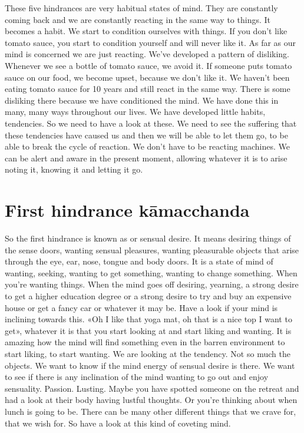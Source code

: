 \documentclass[letterpaper,10pt,english]{sphinxmanual}
\begin{document}
\sphinxAtStartPar
These five hindrances are very habitual states of mind. They are constantly  coming  back  and  we  are  constantly  reacting  in  the  same  way  to
things. It becomes a habit. We start to condition ourselves with things. If you
don’t like tomato sauce, you start to condition yourself and will never like
it. As far as our mind is concerned we are just reacting. We’ve developed a
pattern of disliking. Whenever we see a bottle of tomato sauce, we avoid it.
If someone puts tomato sauce on our food, we become upset, because we
don’t like it. We haven’t been eating tomato sauce for 10 years and still react
in the same way. There is some disliking there because we have conditioned
the mind. We have done this in many, many ways throughout our lives. We
have developed little habits, tendencies. So we need to have a look at these.
We need to see the suffering that these tendencies have caused us and then
we will be able to let them go, to be able to break the cycle of reaction. We
don’t have to be reacting machines. We can be alert and aware in the present
moment, allowing whatever it is to arise noting it, knowing it and letting it
go.


\section{First hindrance kāmacchanda}
\label{\detokenize{3-a:first-hindrance-kamacchanda}}
\sphinxAtStartPar
So the first hindrance is known as
or sensual desire. It
means desiring things of the sense doors, wanting sensual pleasures, wanting pleasurable objects that arise through the eye, ear, nose, tongue and body
doors. It is a state of mind of wanting, seeking, wanting to get something,
wanting to change something. When you’re wanting things. When the mind
goes off desiring, yearning, a strong desire to get a higher education degree
or a strong desire to try and buy an expensive house or get a fancy car or
whatever it may be. Have a look if your mind is inclining towards this. «Oh I
like that yoga mat, oh that is a nice top I want to get», whatever it is that you
start looking at and start liking and wanting. It is amazing how the mind will
  find something even in the barren environment to start liking, to start wanting. We are looking at the tendency. Not so much the objects. We want to
know if the mind energy of sensual desire is there. We want to see if there is
any inclination of the mind wanting to go out and enjoy sensuality. Passion.
Lusting. Maybe you have spotted someone on the retreat and had a look at
their body having lustful thoughts. Or you’re thinking about when lunch is
going to be. There can be many other different things that we crave for, that
we wish for. So have a look at this kind of coveting mind.
\end{document}
